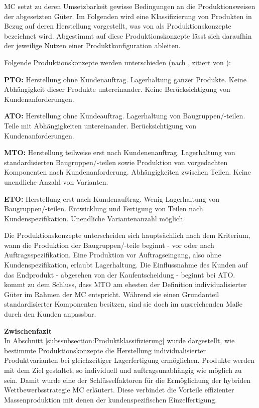 \documentclass[12pt,a4paper,bibliography=totocnumbered,listof=totoc]{scrartcl}
\begin{document}
\ac{MC} setzt zu deren Umsetzbarkeit gewisse Bedingungen an die Produktionsweisen der abgesetzten Güter. Im Folgenden wird eine Klassifizierung von Produkten in Bezug auf deren Herstellung vorgestellt, was von \citet{schuh06} als Produktionskonzepte bezeichnet wird. Abgestimmt auf diese Produktionskonzepte lässt sich daraufhin der jeweilige Nutzen einer Produktkonfiguration ableiten.

Folgende Produktionskonzepte werden unterschieden (nach \citealt{schuh06}, zitiert von \citealt{lutz11}):
\begin{compactitem}
	\item \textbf{\ac{PTO}:} Herstellung ohne Kundenauftrag. Lagerhaltung ganzer Produkte. Keine Abhängigkeit dieser Produkte untereinander. Keine Berücksichtigung von Kundenanforderungen.
	\item \textbf{\ac{ATO}:} Herstellung ohne Kundeauftrag. Lagerhaltung von Baugruppen/-teilen. Teile mit Abhängigkeiten untereinander. Berücksichtigung von Kundenanforderungen.
	\item \textbf{\ac{MTO}:} Herstellung teilweise erst nach Kundenenauftrag. Lagerhaltung von standardisierten Baugruppen/-teilen sowie Produktion von vorgedachten Komponenten nach Kundenanforderung. Abhängigkeiten zwischen Teilen. Keine unendliche Anzahl von Varianten.
	\item \textbf{\ac{ETO}:} Herstellung erst nach Kundenauftrag. Wenig Lagerhaltung von Baugruppen/-teilen. Entwicklung und Fertigung von Teilen nach Kundenspezifikation. Unendliche Variantenanzahl möglich.
\end{compactitem}

Die Produktionskonzepte unterscheiden sich hauptsächlich nach dem Kriterium, wann die Produktion der Baugruppen/-teile beginnt - vor oder nach Auftragsspezifikation. Eine Produktion vor Auftragseingang, also ohne Kundenspezifikation, erlaubt Lagerhaltung. Die Einflussnahme des Kunden auf das Endprodukt - abgesehen von der Kaufentscheidung - beginnt bei \ac{ATO}. \citeauthor{lutz11} kommt zu dem Schluss, dass \ac{MTO} am ehesten der Definition individualisierter Güter im Rahmen der \ac{MC} entspricht. Während sie einen Grundanteil standardisierter Komponenten besitzen, sind sie doch im ausreichenden Maße durch den Kunden anpassbar.

\textbf{Zwischenfazit}\\
In Abschnitt \ref{subssubsection:Produktklassifizierung} wurde dargestellt, wie bestimmte Produktionskonzepte die Herstellung individualisierter Produktvarianten bei gleichzeitiger Lagerfertigung ermöglichen. Produkte werden mit dem Ziel gestaltet, so individuell und auftragsunabhängig wie möglich zu sein. Damit wurde eine der Schlüsselfaktoren für die Ermöglichung der hybriden Wettbewerbsstrategie \ac{MC} erläutert. Diese verbindet die Vorteile effizienter Massenproduktion mit denen
der kundenspezifischen Einzelfertigung\citep{piller98}.
\end{document}
